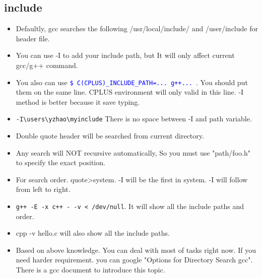\documentclass[a4paper,12pt,twoside]{book}
\newcommand{\linuxcommand}[1]{\texttt{\textcolor{blue}{\$ #1 \Pisymbol{psy}{191}}}}
\begin{document}
\subsection{include}
    \begin{itemize}		
    \item Defaultly, gcc searches the following /usr/local/include/ and /user/include for header file.				
	\item You can use -I to add your include path, but It will only affect current gcc/g++ command.

	\item You also can use \linuxcommand{C(CPLUS)\_INCLUDE\_PATH=... g++...}. You should put them on the same line. CPLUS environment will only valid in this line. -I method is better because it save typing.

	\item \verb=-I\users\yzhao\myinclude= There is no space between -I and path variable. 

		\item Double quote header will be searched from current directory. 

		\item Any search will NOT recursive automatically, So you must use "path/foo.h" to specify the exact position. 

		\item For search order. quote>system. -I will be the first in system. -I will follow from left to right.

		\item \verb=g++ -E -x c++ - -v < /dev/null=. It will show all the include paths and order. 

		\item cpp -v hello.c will also show all the include paths. 

		\item Based on above knowledge. You can deal with most of tasks right now. If you need harder requirement. you can google "Options for Directory Search gcc". There is a gcc document to introduce this topic.  
		
			\end{itemize}
\end{document}
